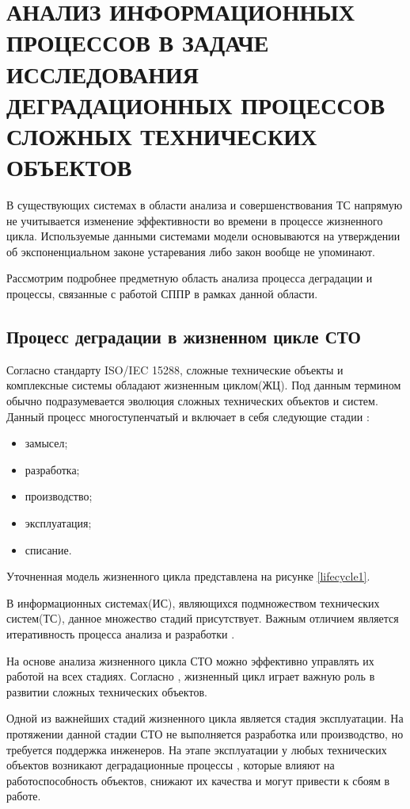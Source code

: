 \section{АНАЛИЗ ИНФОРМАЦИОННЫХ ПРОЦЕССОВ В ЗАДАЧЕ ИССЛЕДОВАНИЯ ДЕГРАДАЦИОННЫХ ПРОЦЕССОВ СЛОЖНЫХ ТЕХНИЧЕСКИХ ОБЪЕКТОВ}
 
В существующих системах в области анализа и совершенствования ТС напрямую не учитывается изменение эффективности во времени в процессе жизненного цикла. 
Используемые данными системами модели основываются на утверждении об экспоненциальном законе устаревания либо закон вообще не упоминают. 

Рассмотрим подробнее предметную область анализа процесса деградации и процессы, связанные с работой СППР в рамках данной области.

\subsection{Процесс деградации в жизненном цикле СТО}
Согласно стандарту ISO/IEC 15288, сложные технические объекты и комплексные системы обладают жизненным циклом(ЖЦ).
Под данным термином обычно подразумевается эволюция сложных технических объектов и систем.
Данный процесс многоступенчатый и включает в себя следующие стадии \cite{Dagabyan}:
\begin{itemize}
    \item замысел;
    \item разработка;
    \item производство;
    \item эксплуатация;
    \item списание.
\end{itemize}
Уточненная модель жизненного цикла представлена на рисунке \ref{lifecycle1}.


В информационных системах(ИС), являющихся подмножеством технических систем(ТС), данное множество стадий присутствует.
Важным отличием является итеративность процесса анализа и разработки \cite{Dagabyan}.

На основе анализа жизненного цикла СТО можно эффективно управлять их работой на всех стадиях.
Согласно \cite{Doronina}, жизненный цикл играет важную роль в развитии сложных технических объектов.

Одной из важнейших стадий жизненного цикла является стадия эксплуатации.
На протяжении данной стадии СТО не выполняется разработка или производство,
но требуется поддержка инженеров. 
На этапе эксплуатации у любых технических объектов возникают деградационные процессы \cite{Miroshnikova}, которые влияют на работоспособность объектов, снижают их качества и могут привести к сбоям в работе.

